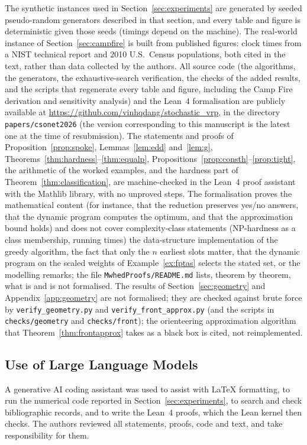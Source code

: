 \documentclass[pdflatex,sn-mathphys-ay]{sn-jnl}
\theoremstyle{thmstyleone}
\theoremstyle{thmstyletwo}
\theoremstyle{thmstylethree}
\begin{document}
The synthetic instances used in Section~\ref{sec:experiments} are
generated by seeded pseudo-random generators described in that section,
and every table and figure is deterministic given those seeds (timings
depend on the machine). The real-world instance of
Section~\ref{sec:campfire} is built from published figures: clock times
from a NIST technical report \citep{nist2021campfire} and 2010 U.S.\
Census populations, both cited in the text, rather than data collected by
the authors. All source code (the algorithms, the generators, the
exhaustive-search verification, the checks of the added results, and the
scripts that regenerate every table and figure, including the Camp Fire
derivation and sensitivity analysis) and the Lean~4 formalisation are
publicly available at \url{https://github.com/vinhqdang/stochastic_vrp}, in
the directory \texttt{papers/csonet2026} (the version corresponding to
this manuscript is the latest one at the time of resubmission).
The statements and proofs of Proposition~\ref{prop:spoke},
Lemmas~\ref{lem:edd} and~\ref{lem:g}, Theorems~\ref{thm:hardness}--\ref{thm:equalp},
Propositions~\ref{prop:consth}--\ref{prop:tight}, the arithmetic of the
worked examples, and the hardness part of
Theorem~\ref{thm:classification}, are machine-checked in the Lean~4 proof
assistant with the Mathlib library, with no unproved steps. The
formalisation proves the mathematical content (for instance, that the
reduction preserves yes/no answers, that the dynamic program computes the
optimum, and that the approximation bound holds) and does not cover
complexity-class statements (NP-hardness as a class membership, running
times) the data-structure implementation of the greedy algorithm, the fact that
only the $n$ earliest slots matter, that the dynamic program on the scaled
weights of Example~\ref{ex:fptas} selects the stated set, or the modelling
remarks; the file \texttt{MwhedProofs/README.md} lists, theorem by theorem, what is and
is not formalised. The results of Section~\ref{sec:geometry} and
Appendix~\ref{app:geometry} are not formalised; they are checked against
brute force by \texttt{verify\_geometry.py} and
\texttt{verify\_front\_approx.py} (and the scripts in
\texttt{checks/geometry} and \texttt{checks/front}); the orienteering
approximation algorithm that Theorem~\ref{thm:frontapprox} takes as a
black box is cited, not reimplemented.

\subsection*{Use of Large Language Models}
A generative AI coding assistant was used to assist with
LaTeX formatting, to run the numerical code reported in
Section~\ref{sec:experiments}, to search and check bibliographic records,
and to write the Lean~4 proofs, which the Lean kernel then checks. The
authors reviewed all statements, proofs, code and text, and take
responsibility for them.
\end{document}
